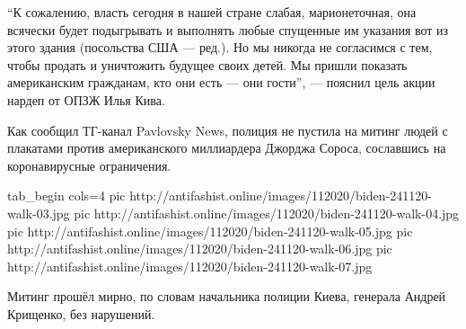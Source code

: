 \enquote{К сожалению, власть сегодня в нашей стране слабая, марионеточная, она
всячески будет подыгрывать и выполнять любые спущенные им указания вот из этого
здания (посольства США --- ред.). Но мы никогда не согласимся с тем, чтобы
продать и уничтожить будущее своих детей. Мы пришли показать американским
гражданам, кто они есть --- они гости}, --- пояснил цель акции нардеп от ОПЗЖ Илья
Кива.

Как сообщил ТГ-канал Pavlovsky News, полиция не пустила на митинг людей с плакатами против американского миллиардера Джорджа Сороса, сославшись на коронавирусные ограничения.

\ifcmt
tab_begin cols=4
pic http://antifashist.online/images/112020/biden-241120-walk-03.jpg
pic http://antifashist.online/images/112020/biden-241120-walk-04.jpg
pic http://antifashist.online/images/112020/biden-241120-walk-05.jpg
pic http://antifashist.online/images/112020/biden-241120-walk-06.jpg
pic http://antifashist.online/images/112020/biden-241120-walk-07.jpg
\fi

Митинг прошёл мирно, по словам начальника полиции Киева, генерала Андрей
Крищенко, без нарушений.

